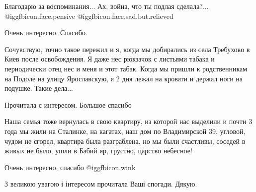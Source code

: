 \begin{itemize}

Благодарю за воспоминания... Ах, война, что ты подлая сделала?...
@igg{fbicon.face.pensive}  @igg{fbicon.face.sad.but.relieved} 

Очень интересно. Спасибо.


Сочувствую, точно такое пережил и я, когда мы добирались из села Требухово в
Киев после освобождения. Я даже нес рюкзачок с листьями табака и периодически
отец нес и меня и этот табак. Когда мы пришли к родственникам на Подоле на
улицу Ярославскую, я 2 дня лежал на кровати и держал ноги на подушке. Такие
дела...

Прочитала с интересом. Большое спасибо


Наша семья тоже вернулась в свою квартиру, из которой нас выделили и почти 3
года мы жили на Сталинке, на кагатах, наш дом по Владимирской 39, угловой,
чудом не сгорел, квартира была разграблена, но мы были счастливы, соседей в
живых не было, ушли в Бабий яр, грустно, царство небесное!

Очень интересно, спасибо  @igg{fbicon.wink} 

З великою увагою і інтересом прочитала Ваші спогади. Дякую.

\end{itemize} %
